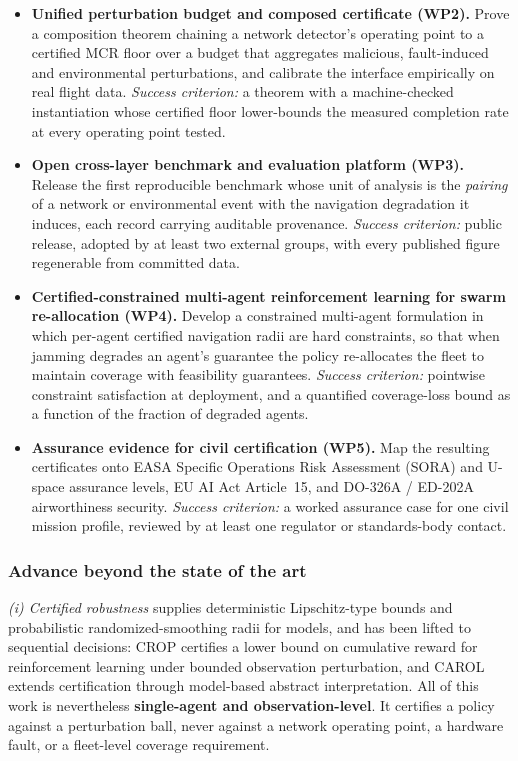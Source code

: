 \documentclass[11pt,a4paper]{article}
\begin{document}
\begin{itemize}
\item[\textbf{O1}] \textbf{Unified perturbation budget and composed certificate (WP2).} Prove a composition theorem chaining a network detector's operating point to a certified MCR floor over a budget that aggregates malicious, fault-induced and environmental perturbations, and calibrate the interface empirically on real flight data. \emph{Success criterion:} a theorem with a machine-checked instantiation whose certified floor lower-bounds the measured completion rate at every operating point tested.
\item[\textbf{O2}] \textbf{Open cross-layer benchmark and evaluation platform (WP3).} Release the first reproducible benchmark whose unit of analysis is the \emph{pairing} of a network or environmental event with the navigation degradation it induces, each record carrying auditable provenance. \emph{Success criterion:} public release, adopted by at least two external groups, with every published figure regenerable from committed data.
\item[\textbf{O3}] \textbf{Certified-constrained multi-agent reinforcement learning for swarm re-allocation (WP4).} Develop a constrained multi-agent formulation in which per-agent certified navigation radii are hard constraints, so that when jamming degrades an agent's guarantee the policy re-allocates the fleet to maintain coverage with feasibility guarantees. \emph{Success criterion:} pointwise constraint satisfaction at deployment, and a quantified coverage-loss bound as a function of the fraction of degraded agents.
\item[\textbf{O4}] \textbf{Assurance evidence for civil certification (WP5).} Map the resulting certificates onto EASA Specific Operations Risk Assessment (SORA) and U-space assurance levels, EU AI Act Article~15, and DO-326A / ED-202A airworthiness security. \emph{Success criterion:} a worked assurance case for one civil mission profile, reviewed by at least one regulator or standards-body contact.
\end{itemize}

\subsubsection{Advance beyond the state of the art}
\emph{(i) Certified robustness} supplies deterministic Lipschitz-type bounds and probabilistic randomized-smoothing radii for models, and has been lifted to sequential decisions: CROP certifies a lower bound on cumulative reward for reinforcement learning under bounded observation perturbation, and CAROL extends certification through model-based abstract interpretation. All of this work is nevertheless \textbf{single-agent and observation-level}. It certifies a policy against a perturbation ball, never against a network operating point, a hardware fault, or a fleet-level coverage requirement.
\end{document}
